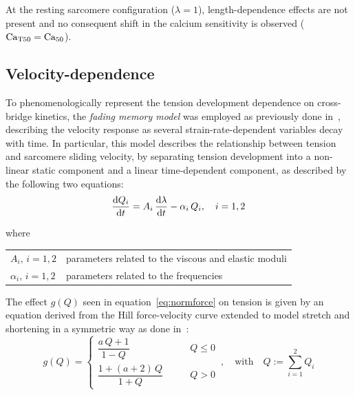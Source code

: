 \vspace{0.3cm}\noindent
At the resting sarcomere configuration ($\lambda=1$), length-dependence effects are not present and no consequent shift in the calcium sensitivity is observed ($\textrm{Ca}_{\textrm{T}50}=\textrm{Ca}_{50}$).



%
%
%
\subsection{Velocity-dependence}
To phenomenologically represent the tension development dependence on cross-bridge kinetics, the \emph{fading memory model} was employed as previously done in~\cite{Niederer:2006}, describing the velocity response as several strain-rate-dependent variables decay with time. In particular, this model describes the relationship between tension and sarcomere sliding velocity, by separating tension development into a non-linear static component and a linear time-dependent component, as described by the following two equations:
%
\begin{equation}
    \dfrac{\mathrm{d}{Q_i}}{\mathrm{d}{t}} = A_i\,\dfrac{\mathrm{d}{\lambda}}{\mathrm{d}{t}}-\alpha_i\,Q_i,\quad i=1,2
\end{equation}

\noindent
where

\vspace{0.2cm}
\begin{tabular}{ll}
    $A_i,\,i=1,2$      & parameters related to the viscous and elastic moduli \\
    $\alpha_i,\,i=1,2$ & parameters related to the frequencies
\end{tabular}

\vspace{0.3cm}\noindent
The effect $g(Q)$ seen in equation~\eqref{eq:normforce} on tension is given by an equation derived from the Hill force-velocity curve extended to model stretch and shortening in a symmetric way as done in~\cite{Niederer:2006}:
%
\begin{equation}
    g(Q) = \begin{cases}
        \dfrac{a\,Q+1}{1-Q}\qquad & Q\le 0 \\
        \dfrac{1+(a+2)\,Q}{1+Q}\qquad & Q>0
    \end{cases}\,,\quad\text{with}\quad Q := \sum_{i=1}^2 Q_i
\end{equation}

